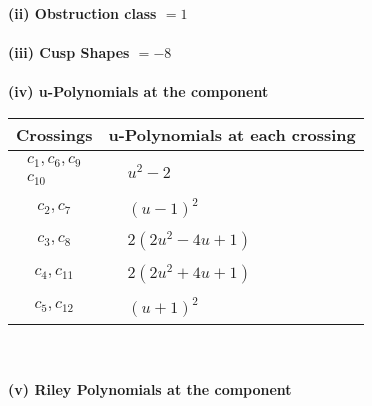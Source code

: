 \documentclass[1p]{elsarticle_modified}
\theoremstyle{definition}
\begin{document}
\flushleft \textbf{(ii) Obstruction class $= 1$}\\~\\
\flushleft \textbf{(iii) Cusp Shapes $= -8$}\\~\\
\newpage\renewcommand{\arraystretch}{1}
\flushleft \textbf{(iv) u-Polynomials at the component}\newline \\
\begin{tabular}{m{50pt}|m{274pt}}
Crossings & \hspace{64pt}u-Polynomials at each crossing \\
\hline $$\begin{aligned}c_{1},c_{6},c_{9}\\c_{10}\end{aligned}$$&$\begin{aligned}
&u^2-2
\end{aligned}$\\
\hline $$\begin{aligned}c_{2},c_{7}\end{aligned}$$&$\begin{aligned}
&(u-1)^2
\end{aligned}$\\
\hline $$\begin{aligned}c_{3},c_{8}\end{aligned}$$&$\begin{aligned}
&2(2 u^2-4 u+1)
\end{aligned}$\\
\hline $$\begin{aligned}c_{4},c_{11}\end{aligned}$$&$\begin{aligned}
&2(2 u^2+4 u+1)
\end{aligned}$\\
\hline $$\begin{aligned}c_{5},c_{12}\end{aligned}$$&$\begin{aligned}
&(u+1)^2
\end{aligned}$\\
\hline
\end{tabular}\\~\\
\newpage\renewcommand{\arraystretch}{1}
\flushleft \textbf{(v) Riley Polynomials at the component}\newline \\
\end{document}
